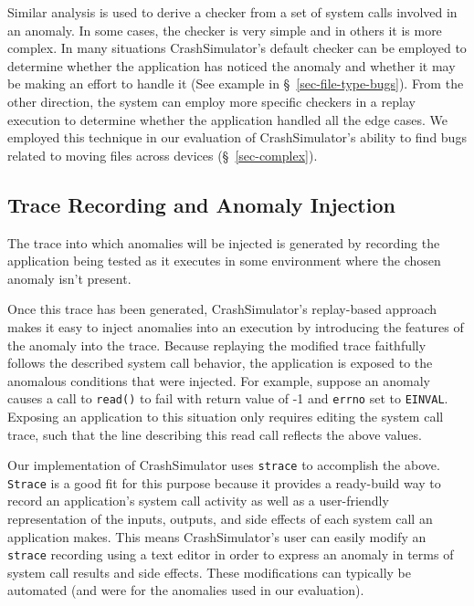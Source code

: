 Similar analysis is used to derive a checker from a set of system calls
involved in an anomaly.  In some cases, the checker is very simple and in
others it is more complex.  In many situations CrashSimulator's default
checker can be employed to determine whether the application has noticed
the anomaly and whether it may be making an effort to handle it (See
example in \S~\ref{sec-file-type-bugs}).  From the other direction, the
system can employ more specific checkers in a replay execution to determine
whether the application handled all the edge cases.  We employed this
technique in our evaluation of CrashSimulator's ability to find bugs
related to moving files across devices (\S~\ref{sec-complex}).
 
\subsection{Trace Recording and Anomaly Injection}

The trace into which anomalies will be injected is generated by recording
the application being tested as it executes in some environment where the
chosen anomaly isn't present.

Once this trace has been generated, CrashSimulator's replay-based approach
makes it easy to inject anomalies into an execution by introducing the
features of the anomaly into the trace.  Because replaying the modified
trace faithfully follows the described system call behavior, the
application is exposed to the anomalous conditions that were injected.  For
example, suppose an anomaly causes a call to {\tt read()} to fail with
return value of -1 and {\tt errno} set to {\tt EINVAL}.  Exposing an
application to this situation only requires editing the system call trace,
such that the line describing this read call reflects the above values.

Our implementation of CrashSimulator uses {\tt strace} to accomplish the
above.  {\tt Strace} is a good fit for this purpose because it provides a
ready-build way to record an application's system call activity as well as
a user-friendly representation of the inputs, outputs, and side effects of
each system call an application makes.  This means CrashSimulator's user
can easily modify an {\tt strace} recording using a text editor in order to
express an anomaly in terms of system call results and side effects.  These
modifications can typically be automated (and were for the anomalies used
in our evaluation).


